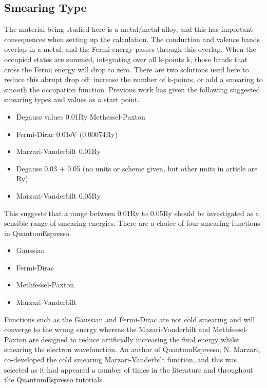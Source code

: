 \subsection{Smearing Type}

The material being studied here is a metal/metal alloy, and this has important consequences when setting up the calculation.  The conduction and valence bands overlap in a metal, and the Fermi energy passes through this overlap. When the occupied states are summed, integrating over all k-points k\cite{marzarivanderbilt}, those bands that cross the Fermi energy will drop to zero.  There are two solutions used here to reduce this abrupt drop off: increase the number of k-points, or add a smearing to smooth the occupation function.  Previous work has given the following suggested smearing types and values as a start point.

\begin{itemize}
\item Degauss values 0.01Ry Methessel-Paxton \cite{AdsorptionBR2}
\item Fermi-Dirac 0.01eV (0.00074Ry) \cite{NaDiffusion}
\item Marzari-Vanderbilt 0.01Ry \cite{ScBiandYBi}
\item Degauss 0.03 + 0.05 (no units or scheme given, but other units in article are Ry) \cite{CuandPd}
\item Marzari-Vanderbilt 0.05Ry \cite{ecHeuslerAlloy}
\end{itemize}

This suggests that a range between 0.01Ry to 0.05Ry should be investigated as a sensible range of smearing energies.  There are a choice of four smearing functions in QuantumEspresso.

\begin{itemize}
\item Gaussian
\item Fermi-Dirac
\item Methfessel-Paxton
\item Marzari-Vanderbilt
\end{itemize}

Functions such as the Gaussian and Fermi-Dirac are not cold smearing and will converge to the wrong energy whereas the Mazari-Vanderbilt and Methfessel-Paxton are designed to reduce artificially increasing the final energy whilst smearing the electron wavefunction.  An author of QuantumEspresso\cite{quantumespresso}, N. Marzari, co-developed the cold smearing Marzari-Vanderbilt function\cite{marzarithesis1}, and this was selected as it had appeared a number of times in the literature and throughout the QuantumEspresso tutorials.  






